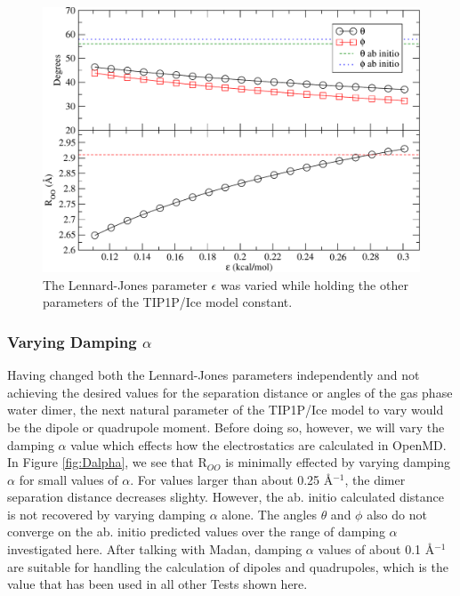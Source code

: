 \begin{figure}[h!]
\includegraphics[width = \linewidth]{Figures/Test2_plot.pdf}
\caption{\label{fig:Epsilon} The Lennard-Jones parameter $\epsilon$ was varied while holding the other parameters of the TIP1P/Ice model constant.}
\end{figure}

\subsubsection{Varying Damping $\alpha$}
Having changed both the Lennard-Jones parameters independently and not 
achieving the desired values for the separation distance or angles of the
gas phase water dimer, the next natural parameter of the TIP1P/Ice model to 
vary would be the dipole or quadrupole moment. Before doing so, however, 
we will vary the damping $\alpha$ value which effects how the electrostatics
are calculated in OpenMD\cite{openmd}. In Figure \ref{fig:Dalpha}, we see that
R$_{OO}$ is minimally effected by varying damping $\alpha$ for small values of
$\alpha$. For values larger than about 0.25 \AA$^{-1}$, the dimer separation
distance decreases slighty. However, the ab. initio calculated distance
is not recovered by varying damping $\alpha$ alone. The angles $\theta$ and
$\phi$ also do not converge on the ab. initio predicted values over the range
of damping $\alpha$ investigated here. After talking with Madan, damping
$\alpha$ values of about 0.1 \AA$^{-1}$ are suitable for handling the 
calculation of dipoles and quadrupoles, which is the value that has been used
in all other Tests shown here.

